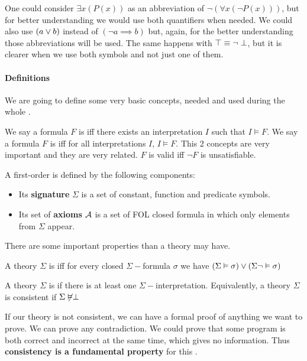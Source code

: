 One could consider $\exists x(P(x))$  as an abbreviation of $\neg (\forall x(\neg P(x)))$, but for better understanding we would use both quantifiers when needed.
We could also use $(a \vee b)$ instead of $(\neg a \implies b)$ but, again, for the better understanding those abbreviations will be used.
The same happens with $\top \equiv \neg \perp$, but it is clearer when we use both symbols and not just one of them.


\paragraph{Definitions}

We are going to define some very basic concepts, needed and used during the whole \thisworkmp.

We say a formula $F$ is  \gls{iff} there exists an interpretation $I$ such that $I \vDash F$. 
%
We say a formula $F$ is  \gls{iff} for all interpretations $I$, $I\vDash F$.
\label{def:validity}
This 2 concepts are very important and they are very related. $F$ is valid \gls{iff} $\neg F$ is unsatisfiable. 


A first-order  is defined by the following components: 
\begin{itemize}
	\item Its \textbf{signature} $\Sigma$ is a set of constant, function and predicate symbols.
	\item Its set of \textbf{axioms} $\mathcal{A}$ is a set of \gls{FOL} closed formula in which only elements from $\Sigma$ appear.
\end{itemize}


There are some important properties than a theory may have. 

A theory $\Sigma$ is  \gls{iff} for every closed $\Sigma-$formula $\sigma$ we have $(\Sigma\vDash \sigma) \vee (\Sigma\neg\vDash \sigma) $

A theory $\Sigma$ is  if there is at least one $\Sigma-$interpretation.	Equivalently, a theory $\Sigma$ is consistent if $\Sigma \not\vDash \perp$

If our theory is not consistent, we can have a formal proof of anything we want to prove. 
%
We can prove any contradiction. 
%
We could prove that some program is both correct and incorrect at the same time, which gives no information. 
%
Thus \textbf{consistency is a fundamental property} for this \thisworkm.

